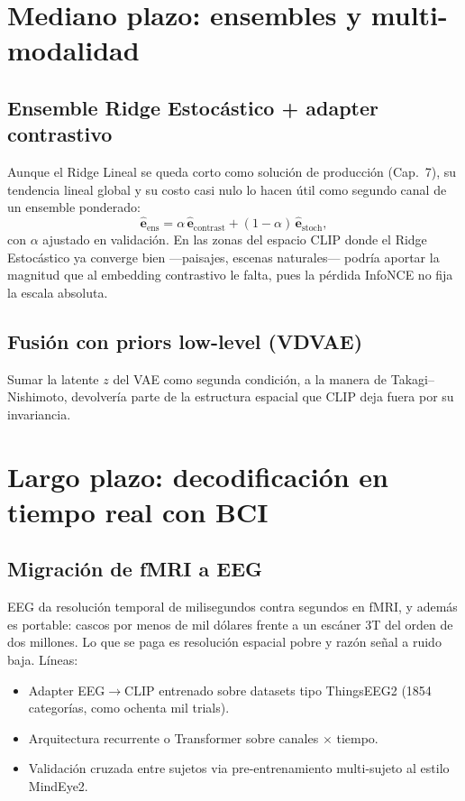 \section{Mediano plazo: ensembles y multi-modalidad}

\subsection{Ensemble Ridge Estocástico + adapter contrastivo}

Aunque el Ridge Lineal se queda corto como solución de producción (Cap.~7), su tendencia lineal 
global y su costo casi nulo lo hacen útil como segundo canal de un ensemble ponderado:
\[
\hat{\mathbf{e}}_{\mathrm{ens}} = \alpha\,\hat{\mathbf{e}}_{\mathrm{contrast}} + (1-\alpha)\,\hat{\mathbf{e}}_{\mathrm{stoch}},
\]
con $\alpha$ ajustado en validación. En las zonas del espacio CLIP donde el Ridge Estocástico ya 
converge bien ---paisajes, escenas naturales--- podría aportar la magnitud que al embedding 
contrastivo le falta, pues la pérdida InfoNCE no fija la escala absoluta.

\subsection{Fusión con priors low-level (VDVAE)}

Sumar la latente $z$ del VAE como segunda condición, a la manera de Takagi--Nishimoto, devolvería 
parte de la estructura espacial que CLIP deja fuera por su invariancia.

\section{Largo plazo: decodificación en tiempo real con BCI}

\subsection{Migración de fMRI a EEG}

EEG da resolución temporal de milisegundos contra segundos en fMRI, y
además es portable: cascos por menos de mil dólares frente a un escáner 3T
del orden de dos millones. Lo que se paga es resolución espacial pobre y razón
señal a ruido baja. Líneas:

\begin{itemize}
\item[•] Adapter EEG$\rightarrow$CLIP entrenado sobre datasets tipo ThingsEEG2 (1854 categorías, 
como ochenta mil trials).
\item[•] Arquitectura recurrente o Transformer sobre canales $\times$ tiempo.
\item[•] Validación cruzada entre sujetos via pre-entrenamiento multi-sujeto al estilo 
MindEye2.
\end{itemize}

